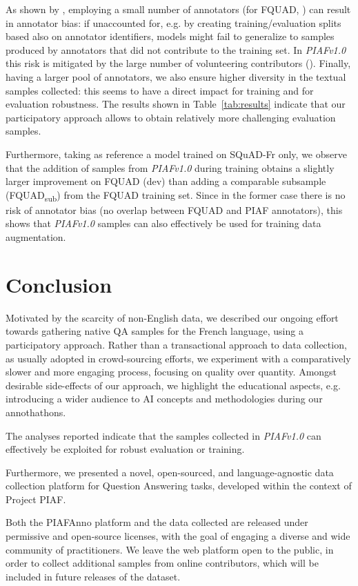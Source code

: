 \documentclass[10pt, a4paper]{article}
\begin{document}
As shown by \cite{geva2019we}, employing a small number of annotators (for FQUAD, ) can result in annotator bias: if unaccounted for, e.g. by creating training/evaluation splits based also on annotator identifiers, models might fail to generalize to samples produced by annotators that did not contribute to the training set. In \emph{PIAFv1.0} this risk is mitigated by the large number of volunteering contributors (). 
Finally, having a larger pool of annotators, we also ensure higher diversity in the textual samples collected: this seems to have a direct impact for training \cite{camembert} and for evaluation robustness.
The results shown in Table~\ref{tab:results} indicate that our participatory approach allows to obtain relatively more challenging evaluation samples. 

Furthermore, taking as reference a model trained on SQuAD-Fr only, we observe that the addition of samples from \emph{PIAFv1.0} during training obtains a slightly larger improvement on FQUAD (dev) than adding a comparable subsample (FQUAD\textsubscript{sub}) from the FQUAD training set. Since in the former case there is no risk of annotator bias (no overlap between FQUAD and PIAF annotators), this shows that \emph{PIAFv1.0} samples can also effectively be used for training data augmentation. 


\section{Conclusion}
Motivated by the scarcity of non-English data, we described our ongoing effort towards gathering native QA samples for the French language, using a participatory approach. Rather than a transactional approach to data collection, as usually adopted in crowd-sourcing efforts, we experiment with a comparatively slower and more engaging process, focusing on quality over quantity.
Amongst desirable side-effects of our approach, we highlight the educational aspects, e.g. introducing a wider audience to AI concepts and methodologies during our annothathons. 

The analyses reported indicate that the samples collected in \emph{PIAFv1.0} can effectively be exploited for robust evaluation or training. 

Furthermore, we presented a novel, open-sourced, and language-agnostic data collection platform for Question Answering tasks, developed within the context of Project PIAF. 

Both the PIAFAnno platform and the data collected are released under permissive and open-source licenses, with the goal of engaging a diverse and wide community of practitioners.
We leave the web platform open to the public, in order to collect additional samples from online contributors, which will be included in future releases of the dataset. 
\end{document}
